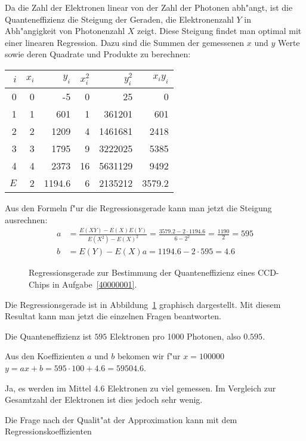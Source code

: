 \begin{loesung}
Da die Zahl der Elektronen linear von der Zahl der Photonen abh"angt,
ist die Quanteneffizienz die Steigung der Geraden, die Elektronenzahl $Y$
in Abh"angigkeit von Photonenzahl $X$ zeigt. Diese Steigung findet man
optimal mit einer linearen Regression. Dazu sind die Summen der gemessenen
$x$ und $y$ Werte sowie deren Quadrate und Produkte zu berechnen:
\begin{center}
\begin{tabular}{|r|rr|rr|r|}
\hline
$i$&$x_i$&$y_i$&$x_i^2$&$y_i^2$&$x_iy_i$\\
\hline
0&0&   -5&  0&     25&    0\\
1&1&  601&  1& 361201&  601\\
2&2& 1209&  4&1461681& 2418\\
3&3& 1795&  9&3222025& 5385\\
4&4& 2373& 16&5631129& 9492\\
\hline
$E$&2& 1194.6&6&2135212&3579.2\\
\hline
\end{tabular}
\end{center}
Aus den Formeln f"ur die Regressionsgerade kann man jetzt die
Steigung ausrechnen:
\begin{align*}
a&=\frac{E(XY)-E(X)E(Y)}{E(X^2)-E(X)^2}=
\frac{3579.2-2 \cdot 1194.6}{6-2^2}=\frac{1190}{2}=595
\\
b&=E(Y)-E(X)a=1194.6-2 \cdot 595=4.6
\end{align*}
\begin{figure}
\centering
{}
\caption{Regressionsgerade zur Bestimmung der Quanteneffizienz eines CCD-Chips
in Aufgabe~\ref{40000001}.
\label{40000001:graphik}}
\end{figure}
Die Regressionsgerade ist in Abbildung~\ref{40000001:graphik} graphisch
dargestellt.
Mit diesem Resultat kann man jetzt die einzelnen Fragen beantworten.
\begin{teilaufgaben}
\item Die Quanteneffizienz ist $595$ Elektronen pro 1000 Photonen, also
$0.595$.
\item
Aus den Koeffizienten $a$ und $b$ bekomen wir f"ur $x=100000$
$y=ax+b=595\cdot 100+4.6=59504.6$.
\item
Ja, es werden im Mittel 4.6 Elektronen zu viel gemessen. Im Vergleich
zur Gesamtzahl der Elektronen ist dies jedoch sehr wenig.
\item
Die Frage nach der Qualit"at der Approximation kann mit dem Regressionskoeffizienten

\end{teilaufgaben}
\end{loesung}
